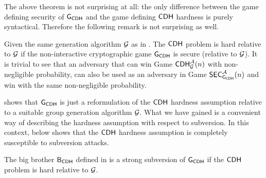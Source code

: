 The above theorem is not surprising at all: the only difference between the game defining security of $\operatorname{\mathsf{G}}_{\mathsf{CDH}}$ and the game defining $\mathsf{CDH}$ hardness is purely syntactical. Therefore the following remark is not surprising as well.

\begin{rem}
Given the same generation algorithm $\operatorname{\mathcal{G}}$ as in . The $\mathsf{CDH}$ problem is hard relative to $\operatorname{\mathcal{G}}$ if the non-interactive cryptographic game $\operatorname{\mathsf{G}}_{\mathsf{CDH}}$ is secure (relative to $\operatorname{\mathcal{G}}$). It is trivial to see that an adversary that can win Game $\mathsf{CDH}_{\operatorname{\mathcal{G}}}^{\mathcal{A}}(n)$ with non-negligible probability, can also be used as an adversary in Game $\mathsf{SEC}_{\operatorname{\mathsf{G}}_{\mathsf{CDH}}}^{\mathcal{A}}(n)$ and win with the same non-negligible probability. 
\end{rem} 

 shows that $\operatorname{\mathsf{G}}_{\mathsf{CDH}}$ is just a reformulation of the $\mathsf{CDH}$ hardness assumption relative to a suitable group generation algorithm $\operatorname{\mathcal{G}}$. What we have gained is a convenient way of describing the hardness assumption with respect to subversion. In this context,  below shows that the $\mathsf{CDH}$ hardness assumption is completely susceptible to subversion attacks.
\begin{thm}
The big brother $\mathsf{B}_{\mathsf{CDH}}$ defined in  is a strong subversion of $\operatorname{\mathsf{G}}_{\mathsf{CDH}}$ if the $\mathsf{CDH}$ problem is hard relative to $\operatorname{\mathcal{G}}$.
\end{thm}


